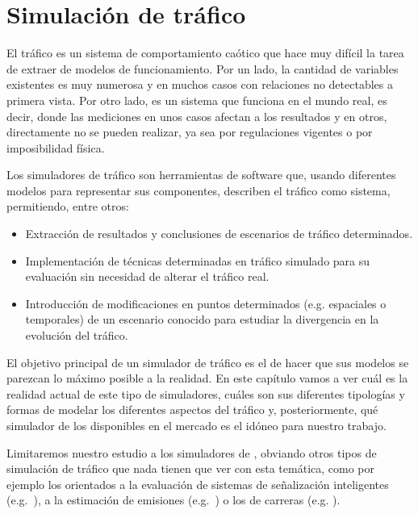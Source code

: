 \chapter{Simulación de tráfico}
\label{ch:sota-traffic-simulation}


El tráfico es un sistema de comportamiento caótico que hace muy difícil la tarea de extraer de modelos de funcionamiento. Por un lado, la cantidad de variables existentes es muy numerosa y en muchos casos con relaciones no detectables a primera vista. Por otro lado, es un sistema que funciona en el mundo real, es decir, donde las mediciones en unos casos afectan a los resultados y en otros, directamente no se pueden realizar, ya sea por regulaciones vigentes o por imposibilidad física.

Los simuladores de tráfico son herramientas de software que, usando diferentes modelos para representar sus componentes, describen el tráfico como sistema, permitiendo, entre otros:

\begin{itemize}
	\item Extracción de resultados y conclusiones de escenarios de tráfico determinados.
	\item Implementación de técnicas determinadas en tráfico simulado para su evaluación sin necesidad de alterar el tráfico real.
	\item Introducción de modificaciones en puntos determinados (e.g. espaciales o temporales) de un escenario conocido para estudiar la divergencia en la evolución del tráfico.
\end{itemize}

El objetivo principal de un simulador de tráfico es el de hacer que sus modelos se parezcan lo máximo posible a la realidad. En este capítulo vamos a ver cuál es la realidad actual de este tipo de simuladores, cuáles son sus diferentes tipologías y formas de modelar los diferentes aspectos del tráfico y, posteriormente, qué simulador de los disponibles en el mercado es el idóneo para nuestro trabajo.

Limitaremos nuestro estudio a los simuladores de , obviando otros tipos de simulación de tráfico que nada tienen que ver con esta temática, como por ejemplo los orientados a la evaluación de sistemas de señalización inteligentes (e.g.~\cite{jin2016evaluation}), a la estimación de emisiones (e.g.~\cite{quaassdorff2016microscale}) o los de carreras (e.g. \cite{Wymann2013}).

